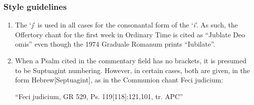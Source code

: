 \documentclass[10pt,parskip,paper=216mm:162mm]{graduale} %
\begin{document}
\subsubsection{Style guidelines}
\begin{enumerate}
    \item The `\emph{j}' is used in all cases for the consonantal form of the `\emph{i}'.
        As such, the Offertory chant for the first week in Ordinary Time is cited as ``Jublate Deo omis''
        even though the 1974 Graduale Romanum prints ``Iubilate''.
    \item When a Psalm cited in the commentary field has no brackets, it is presumed to be
        Suptuagint numbering. However, in certain cases, both are given, in the form
        Hebrew[Septuagint],
        as in the Communion chant Feci judicium:
        \begin{center}
        ``Feci judicium, GR 529, Ps. 119[118]:121,101, tr. APC''
        \end{center}
\end{enumerate}
\end{document}
